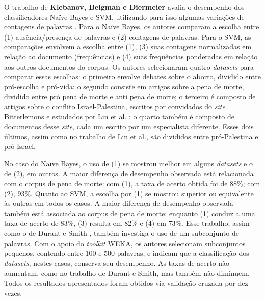 O trabalho de \textbf{Klebanov, Beigman e Diermeier} avalia o desempenho dos classificadores Naïve Bayes e SVM, utilizando para isso algumas variações de contagens de palavras \cite{klebanov}. Para o Naïve Bayes, os autores comparam a escolha entre (1) ausência/presença de palavras e (2) contagens de palavras. Para o SVM, as comparações envolvem a escolha entre (1), (3) suas contagens normalizadas em relação ao documento (frequências) e (4) suas frequências ponderadas em relação aos outros documentos do corpus. Os autores selecionaram quatro \emph{datasets} para comparar essas escolhas: o primeiro envolve debates sobre o aborto, dividido entre pró-escolha e pró-vida; o segundo consiste em artigos sobre a pena de morte, dividido entre pró pena de morte e anti pena de morte; o terceiro é composto de artigos sobre o conflito Israel-Palestina, escritos por convidados do \emph{site} Bitterlemons e estudados por Lin et al. \cite{lin-et-al2006}; o quarto também é composto de documentos desse \emph{site}, cada um escrito por um especialista diferente. Esses dois últimos, assim como no trabalho de Lin et al., são divididos entre pró-Palestina e pró-Israel. 

No caso do Naïve Bayes, o uso de (1) se mostrou melhor em alguns \emph{datasets} e o de (2), em outros. A maior diferença de desempenho observada está relacionada com o corpus de pena de morte: com (1), a taxa de acerto obtida foi de 88\%; com (2), 93\%. Quanto ao SVM, a escolha por (1) se mostrou superior ou equivalente às outras em todos os casos.  A maior diferença de desempenho observada também está associada ao corpus de pena de morte: enquanto (1) conduz a uma taxa de acerto de 83\%, (3) resulta em 82\% e (4) em 73\%. Esse trabalho, assim como o de Durant e Smith \cite{durant-smith}, também investiga o uso de um subconjunto de palavras. Com o apoio do \emph{toolkit} WEKA, os autores selecionam subconjuntos pequenos, contendo entre 100 e 500 palavras, e indicam que a classificação dos \emph{datasets}, nestes casos, conserva seu desempenho. As taxas de acerto não aumentam, como no trabalho de Durant e Smith, mas também não diminuem. Todos os resultados apresentados foram obtidos via validação cruzada por dez vezes.





